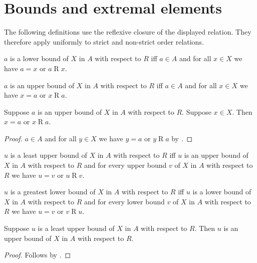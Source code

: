 \section{Bounds and extremal elements}




The following definitions use the reflexive closure of the displayed
relation.  They therefore apply uniformly to strict and non-strict order
relations.

\begin{definition}\label{lower_bound}
    $a$ is a lower bound of $X$ in $A$ with respect to $R$ iff
        $a\in A$ and for all $x\in X$ we have $a=x$ or $a\mathrel{R}x$.
\end{definition}

\begin{definition}\label{upper_bound}
    $a$ is an upper bound of $X$ in $A$ with respect to $R$ iff
        $a\in A$ and for all $x\in X$ we have $x=a$ or $x\mathrel{R}a$.
\end{definition}

\begin{proposition}\label{upper_bound_elim}
    Suppose $a$ is an upper bound of $X$ in $A$ with respect to $R$.
    Suppose $x\in X$.
    Then $x=a$ or $x\mathrel{R}a$.
\end{proposition}
\begin{proof}
    $a\in A$ and for all $y\in X$ we have
        $y=a$ or $y\mathrel{R}a$ by .
\end{proof}

\begin{definition}\label{least_upper_bound}
    $u$ is a least upper bound of $X$ in $A$ with respect to $R$ iff
        $u$ is an upper bound of $X$ in $A$ with respect to $R$ and
        for every upper bound $v$ of $X$ in $A$ with respect to $R$
            we have $u=v$ or $u\mathrel{R}v$.
\end{definition}

\begin{definition}\label{greatest_lower_bound}
    $u$ is a greatest lower bound of $X$ in $A$ with respect to $R$ iff
        $u$ is a lower bound of $X$ in $A$ with respect to $R$ and
        for every lower bound $v$ of $X$ in $A$ with respect to $R$
            we have $u=v$ or $v\mathrel{R}u$.
\end{definition}

\begin{proposition}\label{least_upper_bound_is_upper_bound}
    Suppose $u$ is a least upper bound of $X$ in $A$ with respect to $R$.
    Then $u$ is an upper bound of $X$ in $A$ with respect to $R$.
\end{proposition}
\begin{proof}
    Follows by .
\end{proof}

